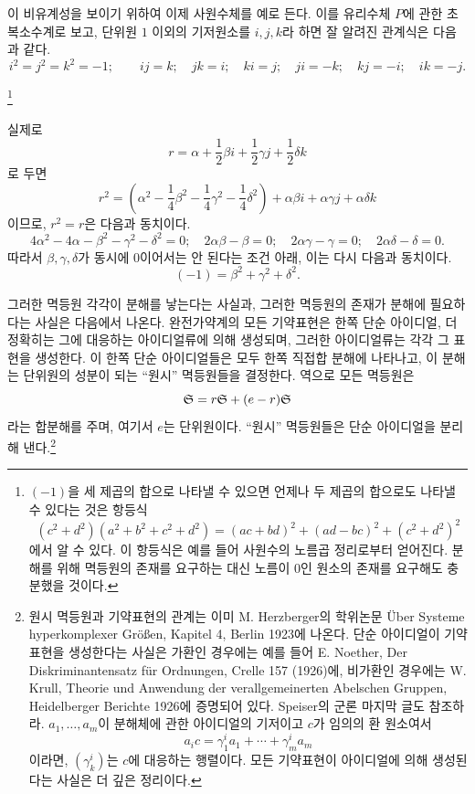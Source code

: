 이 비유계성을 보이기 위하여 이제 사원수체를 예로 든다. 이를 유리수체 $P$에 관한 초복소수계로 보고, 단위원 $1$ 이외의 기저원소를 $i,j,k$라 하면 잘 알려진 관계식은 다음과 같다.
\[
 i^2=j^2=k^2=-1;\qquad ij=k;\quad jk=i;\quad ki=j;\quad ji=-k;\quad kj=-i;\quad ik=-j.
\]

\footnote{$(-1)$을 세 제곱의 합으로 나타낼 수 있으면 언제나 두 제곱의 합으로도 나타낼 수 있다는 것은 항등식
\[
(c^2+d^2)(a^2+b^2+c^2+d^2)=(ac+bd)^2+(ad-bc)^2+(c^2+d^2)^2
\]
에서 알 수 있다. 이 항등식은 예를 들어 사원수의 노름곱 정리로부터 얻어진다. 분해를 위해 멱등원의 존재를 요구하는 대신 노름이 $0$인 원소의 존재를 요구해도 충분했을 것이다.}

실제로
\[
        r=\alpha+\frac12\beta i+\frac12\gamma j+\frac12\delta k
\]
로 두면
\[
        r^2=\left(\alpha^2-\frac14\beta^2-\frac14\gamma^2-\frac14\delta^2\right)
          +\alpha\beta i+\alpha\gamma j+\alpha\delta k
\]
이므로, $r^2=r$은 다음과 동치이다.
\[
4\alpha^2-4\alpha-\beta^2-\gamma^2-\delta^2=0;\quad
2\alpha\beta-\beta=0;\quad 2\alpha\gamma-\gamma=0;\quad 2\alpha\delta-\delta=0.
\]
따라서 $\beta,\gamma,\delta$가 동시에 $0$이어서는 안 된다는 조건 아래, 이는 다시 다음과 동치이다.
\[
        (-1)=\beta^2+\gamma^2+\delta^2.
\]

그러한 멱등원 각각이 분해를 낳는다는 사실과, 그러한 멱등원의 존재가 분해에 필요하다는 사실은 다음에서 나온다. 완전가약계의 모든 기약표현은 한쪽 단순 아이디얼, 더 정확히는 그에 대응하는 아이디얼류에 의해 생성되며, 그러한 아이디얼류는 각각 그 표현을 생성한다. 이 한쪽 단순 아이디얼들은 모두 한쪽 직접합 분해에 나타나고, 이 분해는 단위원의 성분이 되는 ``원시'' 멱등원들을 결정한다. 역으로 모든 멱등원은
\[
\mathfrak S=r\mathfrak S+(e-r)\mathfrak S
\]
라는 합분해를 주며, 여기서 $e$는 단위원이다. ``원시'' 멱등원들은 단순 아이디얼을 분리해 낸다.\footnote{원시 멱등원과 기약표현의 관계는 이미 M. Herzberger의 학위논문 Über Systeme hyperkomplexer Größen, Kapitel 4, Berlin 1923에 나온다. 단순 아이디얼이 기약표현을 생성한다는 사실은 가환인 경우에는 예를 들어 E. Noether, Der Diskriminantensatz für Ordnungen, Crelle 157 (1926)에, 비가환인 경우에는 W. Krull, Theorie und Anwendung der verallgemeinerten Abelschen Gruppen, Heidelberger Berichte 1926에 증명되어 있다. Speiser의 군론 마지막 글도 참조하라. $a_1,\ldots,a_m$이 분해체에 관한 아이디얼의 기저이고 $c$가 임의의 환 원소여서
\[
a_i c=\gamma^i_1a_1+\cdots+\gamma^i_ma_m
\]
이라면, $(\gamma^i_k)$는 $c$에 대응하는 행렬이다. 모든 기약표현이 아이디얼에 의해 생성된다는 사실은 더 깊은 정리이다.}

